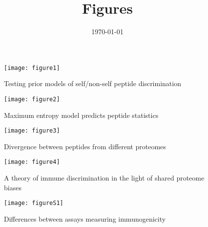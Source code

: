 \documentclass[superscriptaddress,onecolumn,pre]{revtex4}
\newcommand{\<}{\langle}
\renewcommand{\>}{\rangle}
\begin{document}
\title{Figures}
\date{\today}

\maketitle

\begin{figure}
    \texttt{[image: figure1]}
    \caption{Testing prior models of self/non-self peptide discrimination}
\end{figure}

\begin{figure}
    \texttt{[image: figure2]}
    \caption{Maximum entropy model predicts peptide statistics}
\end{figure}


\begin{figure}
    \texttt{[image: figure3]}
    \caption{Divergence between peptides from different proteomes}
\end{figure}

\begin{figure}
    \texttt{[image: figure4]}
    \caption{A theory of immune discrimination in the light of shared proteome biases}
\end{figure}

\begin{figure}
\texttt{[image: figureS1]}
\caption{Differences between assays measuring immunogenicity}
\end{figure}
\end{document}
